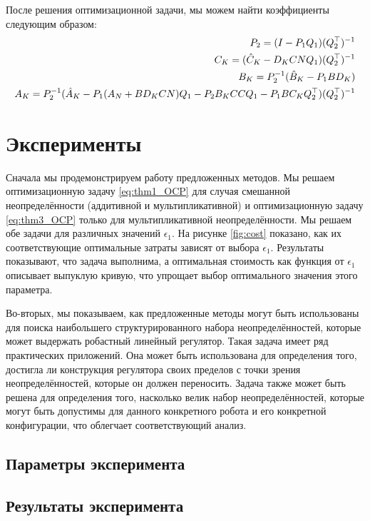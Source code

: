 После решения оптимизационной задачи, мы можем найти коэффициенты следующим образом:
\begin{align}
	{P}_{2} = ({I}-{P}_{1}{Q}_{1})({Q}_{2}^\top)^{-1}\\
	{C}_K = ({\hat{C}}_K - {D}_K {C} {N} {Q}_{1} ) ({Q}_{2}^\top)^{-1}\\
	{B}_K = {P}_{2}^{-1}({\hat{B}}_K- {P}_{1}{B}{D}_K)\\
	{A}_K = {P}_{2}^{-1}({\hat{A}}_K-{P}_{1}({A}_N+{B}{D}_K{C}{N}){Q}_{1} - {P}_{2}{B}_K{C}{C}{Q}_{1}-{P}_{1} {B}{C}_K{Q}_{2}^\top)({Q}_{2}^\top)^{-1}
\end{align}

\section{Эксперименты}\label{sec:ch5/sect2}
Сначала мы продемонстрируем работу предложенных методов. Мы решаем оптимизационную задачу \eqref{eq:thm1_OCP} для случая смешанной неопределённости (аддитивной и мультипликативной) и оптимизационную задачу \eqref{eq:thm3_OCP} только для мультипликативной неопределённости. Мы решаем обе задачи для различных значений $\epsilon_1$. На рисунке \ref{fig:cost} показано, как их соответствующие оптимальные затраты зависят от выбора $\epsilon_1$. Результаты показывают, что задача выполнима, а оптимальная стоимость как функция от $\epsilon_1$ описывает выпуклую кривую, что упрощает выбор оптимального значения этого параметра.

Во-вторых, мы показываем, как предложенные методы могут быть использованы для поиска наибольшего структурированного набора неопределённостей, которые может выдержать робастный линейный регулятор. Такая задача имеет ряд практических приложений. Она может быть использована для определения того, достигла ли конструкция регулятора своих пределов с точки зрения неопределённостей, которые он должен переносить. Задача также может быть решена для определения того, насколько велик набор неопределённостей, которые могут быть допустимы для данного конкретного робота и его конкретной конфигурации, что облегчает соответствующий анализ.

\subsection{Параметры эксперимента}\label{sec:ch5/sect2/sub1}
\subsection{Результаты эксперимента}\label{sec:ch5/sect2/sub2}